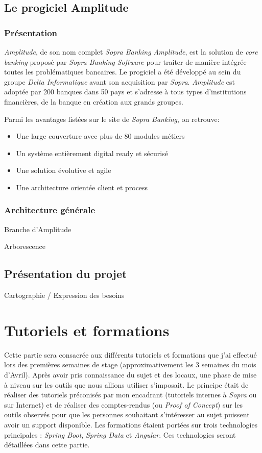 \documentclass{polytech/polytech}
\begin{document}
\chapter{Le progiciel Amplitude}

\section{Présentation}

\textit{Amplitude}, de son nom complet \textit{Sopra Banking Amplitude}, est la solution de \textit{core banking} proposé par \textit{Sopra Banking Software} pour traiter de manière intégrée toutes les problématiques bancaires. Le progiciel a été développé au sein du groupe \textit{Delta Informatique} avant son acquisition par \textit{Sopra}. \textit{Amplitude} est adoptée par 200 banques dans 50 pays et s’adresse à tous types d’institutions financières, de la banque en création aux grands groupes.

Parmi les avantages listées sur le site de \textit{Sopra Banking}, on retrouve: 

\begin{itemize}
	\item Une large couverture avec plus de 80 modules métiers
	\item Un système entièrement digital ready et sécurisé
	\item Une solution évolutive et agile
	\item Une architecture orientée client et process	
\end{itemize}


\section{Architecture générale}


Branche d'Amplitude


Arborescence


\chapter{Présentation du projet}

Cartographie / Expression des besoins


\part{Tutoriels et formations}


Cette partie sera consacrée aux différents tutoriels et formations que j'ai effectué lors des premières semaines de stage (approximativement les 3 semaines du mois d'Avril). Après avoir pris connaissance du sujet et des locaux, une phase de mise à niveau sur les outils que nous allions utiliser s'imposait. Le principe était de réaliser des tutoriels préconisés par mon encadrant (tutoriels internes à \textit{Sopra} ou sur Internet) et de réaliser des comptes-rendus (ou \textit{Proof of Concept}) sur les outils observés pour que les personnes souhaitant s'intéresser au sujet puissent avoir un support disponible. Les formations étaient portées sur trois technologies principales : \textit{Spring Boot}, \textit{Spring Data} et \textit{Angular}. Ces technologies seront détaillées dans cette partie.
\end{document}
